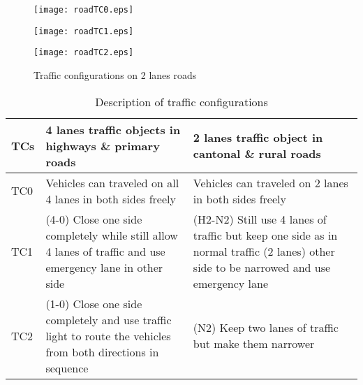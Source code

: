 \documentclass[a4paper,3p,times,authoryear]{elsarticle}
\begin{document}
\begin{figure}[h]
\centering
 \begin{minipage}[h]{0.2\linewidth}
        \centering
        \texttt{[image: roadTC0.eps]}
				\label{roadTC0}
     \end{minipage}
\vspace{3.00mm}
    \begin{minipage}[h]{0.2\linewidth}
       \centering
       \texttt{[image: roadTC1.eps]}
			\label{roadTC1}
     \end{minipage}
\vspace{3.00mm} 
    \begin{minipage}[h]{0.2\linewidth}
        \centering
        \texttt{[image: roadTC2.eps]}
				\label{roadTC2}
     \end{minipage}
\caption{Traffic configurations on 2 lanes roads}
\label{roadTC}
\end{figure}

\begin{table}[H]
\centering
\caption{Description of traffic configurations} \label{trafficconfig}
\begin{tabular}{|l|p{5cm}|p{5cm}|}
\hline
TCs & 4 lanes traffic objects in highways \& primary roads & 2 lanes traffic object in cantonal \& rural roads \\ 
\hline
TC0 & Vehicles can traveled on all 4 lanes in both sides freely & Vehicles can traveled on 2 lanes in both sides freely \\ 
\hline
TC1 & (4-0) Close one side completely while still allow 4 lanes of traffic and use emergency lane in other side & (H2-N2) Still use 4 lanes of traffic but keep one side as in normal traffic (2 lanes) other side to be narrowed and use emergency lane \\ 
\hline
TC2 & (1-0) Close one side completely and use traffic light to route the vehicles from both directions in sequence & (N2) Keep two lanes of traffic but make them narrower\\ 
\hline
\end{tabular}
\end{table}
\end{document}
